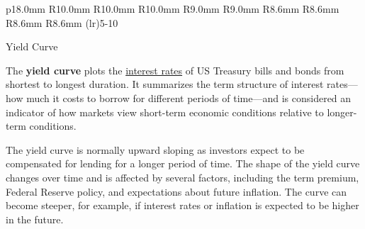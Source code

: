 \newpage
\begin{minipage}{0.76\textwidth} 
\vspace{-3mm}

 \setlength{\tabcolsep}{3.0pt} \color{black!90}
{\renewcommand{\arraystretch}{1.65}
\begin{tabular}{p{18.0mm} R{10.0mm} R{10.0mm} R{10.0mm} R{9.0mm}
		 R{9.0mm} R{8.6mm} R{8.6mm} R{8.6mm} R{8.6mm}}
	\cmidrule(lr){5-10} \addlinespace[-0.6mm]
	 \hline
\end{tabular}}\vspace{-1.5mm}

\vspace{4mm}

\normalsize Yield Curve
\vspace*{-1mm}

\small The \textbf{yield curve} plots the \href{https://www.treasury.gov/resource-center/data-chart-center/interest-rates/Pages/TextView.aspx?data=yield}{interest rates} of US Treasury bills and bonds from shortest to longest duration. It summarizes the term structure of interest rates---how much it costs to borrow for different periods of time---and is considered an indicator of how markets view short-term economic conditions relative to longer-term conditions. 

The yield curve is normally upward sloping as investors expect to be compensated for lending for a longer period of time. The shape of the yield curve changes over time and is affected by several factors, including the term premium, Federal Reserve policy, and expectations about future inflation. The curve can become steeper, for example, if interest rates or inflation is expected to be higher in the future. 
\end{minipage}
\vspace{0.5mm}


